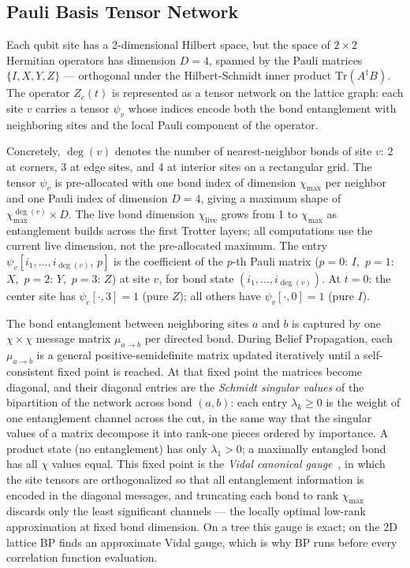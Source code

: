 \documentclass[11pt]{article}
\newcommand{\chimax}{\chi_{\mathrm{max}}}
\begin{document}
\subsection{Pauli Basis Tensor Network}

Each qubit site has a 2-dimensional Hilbert space, but the space of $2\times2$
Hermitian operators has dimension $D=4$, spanned by the Pauli matrices
$\{I, X, Y, Z\}$ — orthogonal under the Hilbert-Schmidt inner product
$\mathrm{Tr}(A^\dagger B)$.
The operator $Z_c(t)$ is represented as a tensor network on the lattice graph:
each site $v$ carries a tensor $\psi_v$ whose indices encode both the bond
entanglement with neighboring sites and the local Pauli component of the operator.

Concretely, $\deg(v)$ denotes the number of nearest-neighbor bonds of site $v$:
2 at corners, 3 at edge sites, and 4 at interior sites on a rectangular grid.
The tensor $\psi_v$ is pre-allocated with one bond index of dimension $\chimax$
per neighbor and one Pauli index of dimension $D=4$, giving a maximum shape of
$\chimax^{\deg(v)} \times D$. The live bond dimension $\chi_{\mathrm{live}}$
grows from 1 to $\chimax$ as entanglement builds across the first Trotter layers;
all computations use the current live dimension, not the pre-allocated maximum.
The entry $\psi_v[i_1, \ldots, i_{\deg(v)},\, p]$ is the coefficient of the
$p$-th Pauli matrix ($p{=}0$: $I$,\ $p{=}1$: $X$,\ $p{=}2$: $Y$,\ $p{=}3$: $Z$)
at site $v$, for bond state $(i_1,\ldots,i_{\deg(v)})$.
At $t=0$: the center site has $\psi_c[\cdot,3]=1$ (pure $Z$); all others have
$\psi_v[\cdot,0]=1$ (pure $I$).

The bond entanglement between neighboring sites $a$ and $b$ is captured by one
$\chi \times \chi$ message matrix $\mu_{a \to b}$ per directed bond.
During Belief Propagation, each $\mu_{a \to b}$ is a general
positive-semidefinite matrix updated iteratively until a self-consistent
fixed point is reached.
At that fixed point the matrices become diagonal, and their diagonal entries
are the \emph{Schmidt singular values} of the bipartition of the network
across bond $(a,b)$: each entry $\lambda_k \geq 0$ is the weight of one
entanglement channel across the cut, in the same way that the singular values
of a matrix decompose it into rank-one pieces ordered by importance.
A product state (no entanglement) has only $\lambda_1 > 0$; a maximally
entangled bond has all $\chi$ values equal.
This fixed point is the \emph{Vidal canonical gauge}~\citep{vidal2004efficient},
in which the site tensors are orthogonalized so that all entanglement
information is encoded in the diagonal messages, and truncating each bond to
rank $\chimax$ discards only the least significant channels — the locally
optimal low-rank approximation at fixed bond dimension.
On a tree this gauge is exact; on the 2D lattice BP finds an approximate
Vidal gauge, which is why BP runs before every correlation function evaluation.
\end{document}
